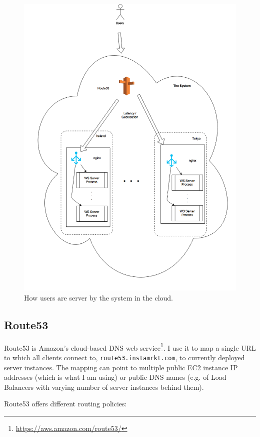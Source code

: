 \documentclass{uvamscse}
\begin{document}
\begin{figure}[H]
\centering
\includegraphics[scale=0.4]{cloudsetup}
\caption{How users are server by the system in the cloud.}
\label{figure:cloudsetup}
\end{figure}

\subsection{Route53}\label{Route53}

Route53 is Amazon's cloud-based DNS web service\footnote{\url{https://aws.amazon.com/route53/}}. I use it to map a single URL to which all clients connect to, \texttt{route53.instamrkt.com}, to currently deployed server instances. The mapping can point to multiple public EC2 instance IP addresses (which is what I am using) or public DNS names (e.g. of Load Balancers with varying number of server instances behind them).

Route53 offers different routing policies:
\end{document}
